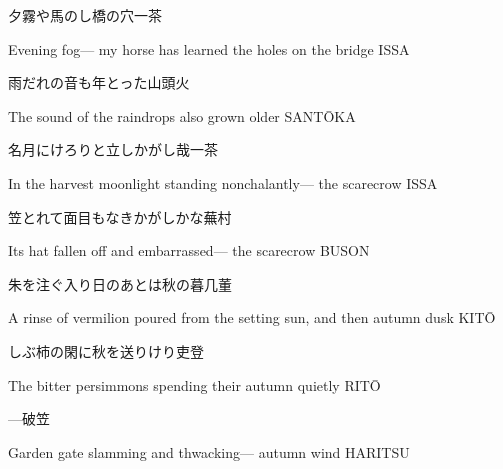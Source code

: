 \begin{haiku}
    {\FH 夕霧や馬のし橋の穴}\hfill{\FH 一茶}

    \vin{} Evening fog---
    \vin{} \vin{} my horse has learned
    \vin{} \vin{} \vin{} the holes on the bridge \hspace{\fill} ISSA
\end{haiku}

\begin{haiku}
    {\FH 雨だれの音も年とった}\hfill{\FH 山頭火}

    \vin{} The sound
    \vin{} \vin{} of the raindrops
    \vin{} \vin{} \vin{} also grown older \hspace{\fill} SANT\={O}KA
\end{haiku}

\begin{haiku}
    {\FH 名月にけろりと立しかがし哉}\hfill{\FH 一茶}

    \vin{} In the harvest moonlight
    \vin{} \vin{} standing nonchalantly---
    \vin{} \vin{} \vin{} the scarecrow \hspace{\fill} ISSA
\end{haiku}

\begin{haiku}
    {\FH 笠とれて面目もなきかがしかな}\hfill{\FH 蕪村}

    \vin{} Its hat fallen off
    \vin{} \vin{} and embarrassed---
    \vin{} \vin{} \vin{} the scarecrow \hspace{\fill} BUSON
\end{haiku}

\begin{haiku}
    {\FH 朱を注ぐ入り日のあとは秋の暮}\hfill{\FH 几董}

    \vin{} A rinse of vermilion poured
    \vin{} \vin{} from the setting sun, and then
    \vin{} \vin{} \vin{} autumn dusk \hspace{\fill} KIT\=O
\end{haiku}

\begin{haiku}
    {\FH しぶ柿の閑に秋を送りけり}\hfill{\FH 吏登}

    \vin{} The bitter persimmons
    \vin{} \vin{} spending their autumn
    \vin{} \vin{} \vin{} quietly \hspace{\fill} RIT\={O}
\end{haiku}

\begin{haiku}
    {---}\hfill{\FH 破笠}

    \vin{} Garden gate
    \vin{} \vin{} slamming and thwacking---
    \vin{} \vin{} \vin{} autumn wind \hspace{\fill} HARITSU
\end{haiku}

